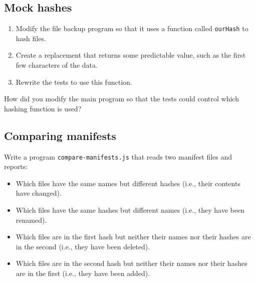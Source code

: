 \documentclass[krantzl]{krantz}
\begin{document}
\subsection*{Mock hashes}

\begin{enumerate}

\item 

Modify the file backup program so that it uses a function called \texttt{ourHash} to hash files.



\item 

Create a replacement that returns some predictable value, such as the first few characters of the data.



\item 

Rewrite the tests to use this function.



\end{enumerate}


How did you modify the main program so that the tests could control which hashing function is used?

\subsection*{Comparing manifests}


Write a program \texttt{compare-manifests.js} that reads two manifest files and reports:

\begin{itemize}

\item 

Which files have the same names but different hashes
    (i.e., their contents have changed).



\item 

Which files have the same hashes but different names
    (i.e., they have been renamed).



\item 

Which files are in the first hash but neither their names nor their hashes are in the second
    (i.e., they have been deleted).



\item 

Which files are in the second hash but neither their names nor their hashes are in the first
    (i.e., they have been added).



\end{itemize}
\end{document}
